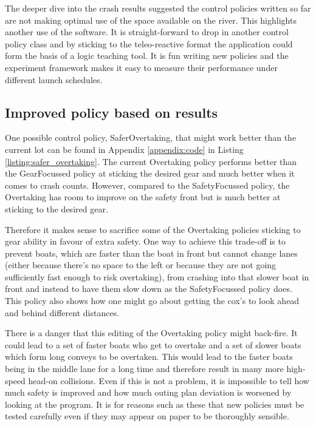   The deeper dive into the crash results suggested the control policies written so far are not making optimal use of the space available on the river. This highlights another use of the software. It is straight-forward to drop in another control policy class and by sticking to the teleo-reactive format the application could form the basis of a logic teaching tool. It is fun writing new policies and the experiment framework makes it easy to measure their performance under different launch schedules.
  
  \subsection{Improved policy based on results}
  One possible control policy, SaferOvertaking, that might work better than the current lot can be found in Appendix \ref{appendix:code} in Listing \ref{listing:safer_overtaking}. The current Overtaking policy performs better than the GearFocussed policy at sticking the desired gear and much better when it comes to crash counts. However, compared to the SafetyFocussed policy, the Overtaking has room to improve on the safety front but is much better at sticking to the desired gear. 
  
  Therefore it makes sense to sacrifice some of the Overtaking policies sticking to gear ability in favour of extra safety. One way to achieve this trade-off is to prevent boats, which are faster than the boat in front but cannot change lanes (either because there's no space to the left or because they are not going sufficiently fast enough to risk overtaking), from crashing into that slower boat in front and instead to have them slow down as the SafetyFocussed policy does. This policy also shows how one might go about getting the cox's to look ahead and behind different distances. 
  
  There is a danger that this editing of the Overtaking policy might back-fire. It could lead to a set of faster boats who get to overtake and a set of slower boats which form long conveys to be overtaken. This would lead to the faster boats being in the middle lane for a long time and therefore result in many more high-speed head-on collisions. Even if this is not a problem, it is impossible to tell how much safety is improved and how much outing plan deviation is worsened by looking at the program. It is for reasons such as these that new policies must be tested carefully even if they may appear on paper to be thoroughly sensible.
  
